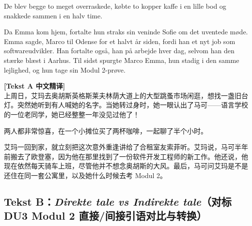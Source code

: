 De blev begge to meget overraskede, købte to kopper kaffe i en lille bod og snakkede sammen i en halv time.

Da Emma kom hjem, fortalte hun straks sin veninde Sofie om det uventede møde. Emma sagde,  Marco  til Odense for et halvt år siden, fordi han  et nyt job som softwareudvikler. Han fortalte også,  han  på arbejde hver dag, selvom han  den stærke blæst i Aarhus. Til sidst spurgte Marco Emma,  hun stadig  i den samme lejlighed, og  hun  tage sin Modul 2-prøve.

\begin{transbox}
\small
\textbf{\color{NCDTeal}[Tekst A 中文精译]}\\
上周日，艾玛去奥胡斯英格斯莱夫林荫大道上的大型跳蚤市场闲逛，想找一盏旧台灯。突然她听到有人喊她的名字。当她转过身时，她一眼认出了马可——语言学校的一位老同学，她已经整整一年没见过他了！

两人都非常惊喜，在一个小摊位买了两杯咖啡，一起聊了半个小时。

艾玛一回到家，就立刻把这次意外重逢讲给了合租室友索菲听。艾玛说，马可半年前搬去了欧登塞，因为他在那里找到了一份软件开发工程师的新工作。他还说，他现在依然每天骑车上班，尽管他并不想念奥胡斯的大风。最后，马可问艾玛是不是还住在同一套公寓里，以及她什么时候去考 Modul 2。
\end{transbox}

\subsection*{Tekst B：\textit{Direkte tale vs Indirekte tale}（对标 DU3 Modul 2 直接/间接引语对比与转换）}

